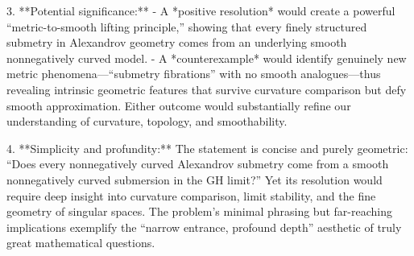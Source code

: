 3. **Potential significance:**  
   - A *positive resolution* would create a powerful “metric-to-smooth lifting principle,” showing that every finely structured submetry in Alexandrov geometry comes from an underlying smooth nonnegatively curved model.  
   - A *counterexample* would identify genuinely new metric phenomena—“submetry fibrations” with no smooth analogues—thus revealing intrinsic geometric features that survive curvature comparison but defy smooth approximation.  
   Either outcome would substantially refine our understanding of curvature, topology, and smoothability.

4. **Simplicity and profundity:**  
   The statement is concise and purely geometric: “Does every nonnegatively curved Alexandrov submetry come from a smooth nonnegatively curved submersion in the GH limit?” Yet its resolution would require deep insight into curvature comparison, limit stability, and the fine geometry of singular spaces. The problem’s minimal phrasing but far-reaching implications exemplify the “narrow entrance, profound depth” aesthetic of truly great mathematical questions.